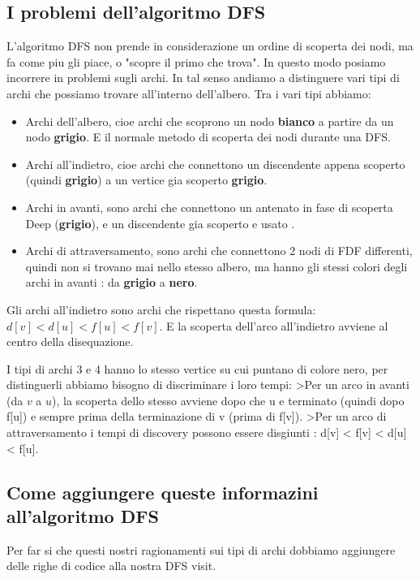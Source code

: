 \subsection{I problemi dell'algoritmo DFS}
L'algoritmo DFS non prende in considerazione un ordine di scoperta dei nodi, ma fa come piu gli piace, o "scopre il primo che trova". In questo modo posiamo incorrere in problemi sugli archi. In tal senso andiamo a distinguere vari tipi di archi che possiamo trovare all'interno dell'albero.
Tra i vari tipi abbiamo:
\begin{itemize}
	\item Archi dell'albero, cioe archi che scoprono un nodo \textbf{bianco} a partire da un nodo \textbf{grigio}. E il normale metodo di scoperta dei nodi durante una DFS.
	\item Archi all'indietro, cioe archi che connettono un discendente appena scoperto (quindi \textbf{grigio}) a un vertice gia scoperto \textbf{grigio}.
	\item Archi in avanti, sono archi che connettono un antenato in fase di scoperta Deep (\textbf{grigio}), e un discendente gia scoperto e usato .
	\item Archi di attraversamento, sono archi che connettono 2 nodi  di FDF differenti, quindi non si trovano mai nello stesso albero, ma hanno gli stessi colori degli archi in avanti : da \textbf{grigio} a \textbf{nero}.
\end{itemize}

Gli archi all'indietro sono archi che rispettano questa formula: $d[v] < d[u] < f[u] < f[v]$. E la scoperta dell'arco all'indietro avviene al centro della disequazione.

I tipi di archi 3 e 4 hanno lo stesso vertice su cui puntano di colore nero, per distinguerli abbiamo bisogno di discriminare i loro tempi:
	>Per un arco in avanti (da $v$ a $u$), la scoperta dello stesso avviene dopo che u e terminato (quindi dopo f[u]) e sempre prima della terminazione di v (prima di f[v]).
	>Per un arco di attraversamento i tempi di discovery possono essere disgiunti : d[v] < f[v] < d[u] < f[u].
	
\subsection{Come aggiungere queste informazini all'algoritmo DFS}

Per far si che questi nostri ragionamenti sui tipi di archi dobbiamo aggiungere delle righe di codice alla nostra DFS visit.


